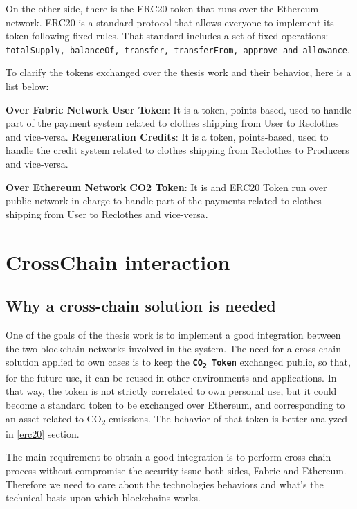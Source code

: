 On the other side, there is the ERC20 token that runs over the Ethereum network. ERC20 is a standard 
protocol that allows everyone to implement its token following fixed rules. That standard includes a 
set of fixed operations: \texttt{totalSupply, balanceOf, transfer, transferFrom, approve 
and allowance}. 

\bigskip
To clarify the tokens exchanged over the thesis work and their behavior, here is a list below:

\begin{outline}[enumerate]
	\1 \textbf{Over Fabric Network}
    \2 \textbf{User Token}: It is a token, points-based, used to handle part of the payment system related to clothes
    shipping from User to Reclothes and vice-versa.
    \2 \textbf{Regeneration Credits}: It is a token, points-based, used to handle the credit system related to clothes
    shipping from Reclothes to Producers and vice-versa.

    \1 \textbf{Over Ethereum Network}
    \2 \textbf{CO2 Token}: It is and ERC20 Token run over public network in charge to handle part of the payments related 
    to clothes shipping from User to Reclothes and vice-versa.
\end{outline}


\clearpage
\section{CrossChain interaction}

\subsection{Why a cross-chain solution is needed}

One of the goals of the thesis work is to implement a good integration between the two blockchain networks 
involved in the system. The need for a cross-chain solution applied to own cases is to keep the 
\textbf{\texttt{CO\textsubscript{2} Token}} exchanged public, so that, for the future use, it can be 
reused in other environments and applications. In that way, the token is not strictly correlated to own 
personal use, but it could become a standard token to be exchanged over Ethereum, and corresponding to an 
asset related to CO\textsubscript{2} emissions. The behavior of that token is better analyzed in \ref{erc20} 
section.
\bigskip

The main requirement to obtain a good integration is to perform cross-chain process without compromise the 
security issue both sides, Fabric and Ethereum. Therefore we need to care about the technologies behaviors 
and what's the technical basis upon which blockchains works. 
\bigskip

